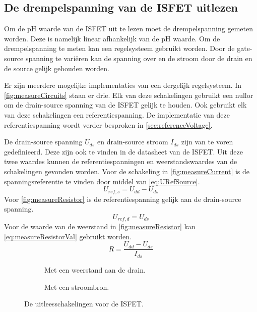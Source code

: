 \subsection{De drempelspanning van de ISFET uitlezen}

Om de pH waarde van de ISFET uit te lezen moet de drempelspanning gemeten worden. Deze is namelijk linear afhankelijk van de pH waarde.
Om de drempelspanning te meten kan een regelsysteem gebruikt worden. Door de gate-source spanning te variëren kan de spanning over en de stroom door de drain en de source gelijk gehouden worden.

Er zijn meerdere mogelijke implementaties van een dergelijk regelsysteem. In \autoref{fig:measureCircuits} staan er drie.
Elk van deze schakelingen gebruikt een nullor om de drain-source spanning van de ISFET gelijk te houden. Ook gebruikt elk van deze schakelingen een referentiespanning. De implementatie van deze referentiespanning wordt verder besproken in \autoref{sec:referenceVoltage}.

De drain-source spanning $U_{ds}$ en drain-source stroom $I_{ds}$ zijn van te voren gedefinieerd. Deze zijn ook te vinden in de datasheet van de ISFET\cite{isfet}. Uit deze twee waardes kunnen de referentiespanningen en weerstandswaardes van de schakelingen gevonden worden.
Voor de schakeling in \autoref{fig:measureCurrent} is de spanningsreferentie te vinden door middel van \autoref{eq:URefSource}.
\begin{equation}\label{eq:URefSource}
    U_{ref,s} = U_{dd} - U_{ds}
\end{equation}
Voor \autoref{fig:measureResistor} is de referentiespanning gelijk aan de drain-source spanning.
\begin{equation}\label{eq:URefDrain}
    U_{ref,d} = U_{ds}
\end{equation}
Voor de waarde van de weerstand in \autoref{fig:measureResistor} kan \autoref{eq:measureResistorVal} gebruikt worden.
\begin{equation}\label{eq:measureResistorVal}
    R = \frac{U_{dd} - U_{ds}}{I_{ds}}
\end{equation}


\begin{figure}[ht]
    \centering
    \begin{subfigure}[b]{0.45\textwidth}
        \centering
        \def\svgwidth{\textwidth}
        
        \caption{Met een weerstand aan de drain.}
        \label{fig:measureResistor}
    \end{subfigure}
    \hfill
    \begin{subfigure}[b]{0.45\textwidth}
        \centering
        \def\svgwidth{\textwidth}
        
        \caption{Met een stroombron.}
        \label{fig:measureCurrent}
    \end{subfigure}
    \caption{De uitleesschakelingen voor de ISFET.}
    \label{fig:measureCircuits}
\end{figure}

